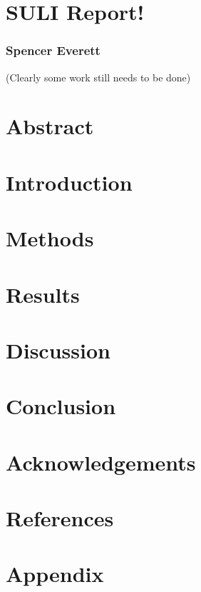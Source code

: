 \documentclass{article}
\begin{document}
\section*{SULI Report!}
\subsubsection*{Spencer Everett}

\newtheorem{problem}{Problem}
\newtheorem*{problem*}{Problem}

\setlength\parindent{0pt}

\vspace{0.25 in}

(Clearly some work still needs to be done)

\section*{Abstract}

\section*{Introduction}

\section*{Methods}

\section*{Results}

\section*{Discussion}

\section*{Conclusion}

\section*{Acknowledgements}

\section*{References}

\section*{Appendix}
\end{document}
